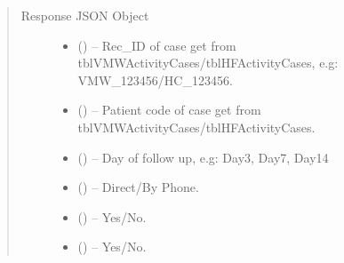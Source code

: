 \documentclass[letterpaper,10pt,english,openany,oneside]{sphinxmanual}
\begin{document}
\begin{fulllineitems}
\begin{sphinxVerbatim}[commandchars=\\\{\}]
     
     
     
     
     
     
     
     
\end{sphinxVerbatim}
\begin{quote}\begin{description}
\item[{Response JSON Object}] \leavevmode\begin{itemize}
\item {} 
\sphinxAtStartPar
{} () – Rec\_ID of case get from tblVMWActivityCases/tblHFActivityCases, e.g: VMW\_123456/HC\_123456.

\item {} 
\sphinxAtStartPar
{} () – Patient code of case get from tblVMWActivityCases/tblHFActivityCases.

\item {} 
\sphinxAtStartPar
{} () – Day of follow up, e.g: Day3, Day7, Day14

\item {} 
\sphinxAtStartPar
{} () – Direct/By Phone.

\item {} 
\sphinxAtStartPar
{} () – Yes/No.

\item {} 
\sphinxAtStartPar
{} () – Yes/No.


\end{itemize}
\end{description}
\end{quote}
\end{fulllineitems}
\end{document}
